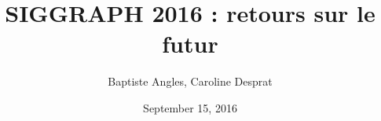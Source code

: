\documentclass[final]{beamer}
\title{SIGGRAPH 2016 : retours sur le futur}
\author{Baptiste Angles, Caroline Desprat}
\date{September 15, 2016}
\begin{document}
\frame{\titlepage}

\frame{\tableofcontents}






\end{document}
